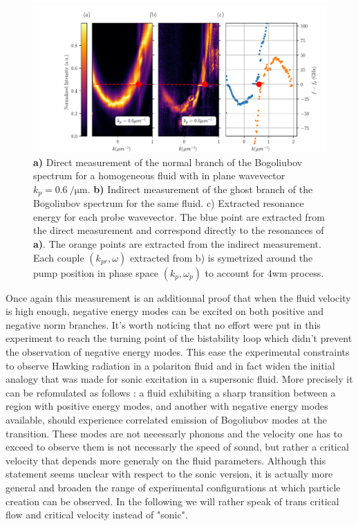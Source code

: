 \begin{figure}
    \centering
    \includegraphics[width=1\textwidth]{chap_custom_st/fig/supersonic_homogenous.pdf}
    \caption{\textbf{a)} Direct measurement of the normal branch of the Bogoliubov spectrum for a homogeneous fluid with in plane wavevector $k_p=\SI{0.6}{\per \micro \meter}.$ \textbf{b)} Indirect measurement of the ghost branch of the Bogoliubov spectrum for the same fluid.
    c) Extracted resonance energy for each probe wavevector. The blue point are extracted from the direct measurement and correspond directly to the resonances of \textbf{a)}. The orange points are extracted from the indirect measurement. Each couple $(k_{pr}, \omega)$ extracted from b) is symetrized around the pump position in phase space $(k_p, \omega_p)$ to account for 4wm process.}
    \label{fig:homogeneous_fluid_bogo_ghost}

\end{figure}

Once again this measurement is an additionnal proof that when the fluid velocity is high enough, negative energy modes can be excited on both positive and negative norm branches.
It's worth noticing that no effort were put in this experiment to reach the turning point of the bistability loop which didn't prevent the observation of negative energy modes. This ease 
the experimental constraints to observe Hawking radiation in a polariton fluid and in fact widen the initial analogy that was made for sonic excitation in a supersonic fluid. More precisely it can be refomulated as follows :
a fluid exhibiting a sharp transition between a region with positive energy modes, and another with negative energy modes available, should experience correlated emission of Bogoliubov modes at the transition.
These modes are not necessarly phonons and the velocity one has to exceed to observe them is not necessarly the speed of sound, but rather a critical velocity that depends more generaly on the fluid parameters.
Although this statement seems unclear with respect to the sonic version, it is actually more general and broaden the range of experimental configurations at which particle creation can be observed. In the following 
we will rather speak of trans critical flow and critical velocity instead of "sonic".






